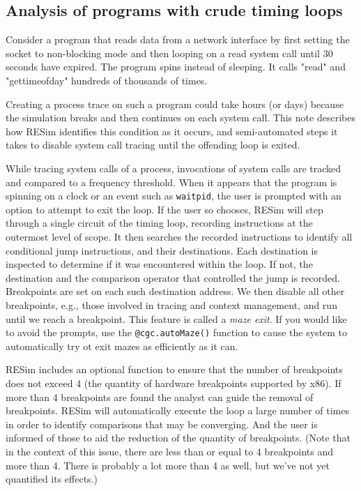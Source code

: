 \documentclass[titlepage]{article}
\begin{document}
\begin{appendices}

\section{Analysis of programs with crude timing loops}
\label{maze}
Consider a program that reads data from a network interface by first setting the socket to non-blocking mode and then looping on a read system call until 30 seconds have expired.  The program spins instead of sleeping.  It calls "read" and "gettimeofday" hundreds of thousands of times.

Creating a process trace on such a program could take hours (or days) because the simulation breaks and then continues on each system call.  This note describes how RESim identifies this condition as it occurs, and semi-automated steps it takes to disable system call tracing until the offending loop is exited.  

While tracing system calls of a process, invocations of system calls are tracked and compared to a frequency threshold.  When it appears that the program is spinning on a clock or an event such as {\tt waitpid}, the user is prompted with an option to attempt to exit the loop. If the user so chooses, RESim will step through a single circuit of the timing loop, recording instructions at the outermost level of scope. It then searches the recorded instructions to identify all conditional jump instructions, and their destinations. Each destination is inspected to determine if it was encountered within the loop.  If not, the destination and the comparison operator that controlled the jump is recorded.  Breakpoints are set on each such destination address.  We then disable all other breakpoints, e.g., those involved in tracing and context management, and run until we reach a breakpoint.  
This feature is called a \textit{maze exit}.  If you would like to avoid the prompts, use the {\tt @cgc.autoMaze()} function to cause the system
to automatically try ot exit mazes as efficiently as it can.

RESim includes an optional function to ensure that the number of breakpoints does not exceed 4 (the quantity of hardware breakpoints supported by x86).  If more than 4 breakpoints are found the analyst can guide the removal of breakpoints. RESim will automatically execute the loop a large number of times in order to identify comparisons that may be converging.  And the user is informed of those to aid the reduction of the quantity of breakpoints.  (Note that in the context of this issue, there are less than or equal to 4 breakpoints and more than 4.  There is probably a lot more than 4 as well, but we've not yet quantified its effects.)


\end{appendices}
\end{document}
